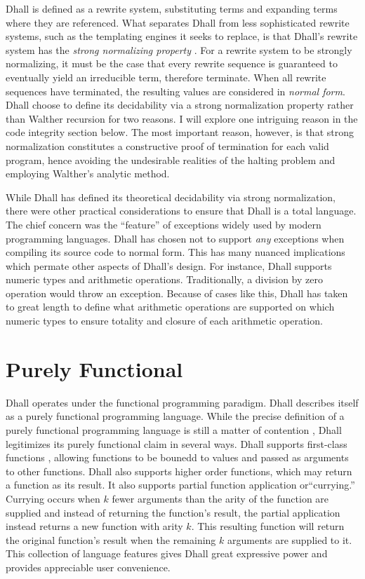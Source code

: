 \documentclass[12pt]{diazessay}
\begin{document}
Dhall is defined as a rewrite system, substituting terms and expanding terms where they are referenced.
What separates Dhall from less sophisticated rewrite systems, such as the templating engines it seeks to replace, is that Dhall's rewrite system has the \emph{strong normalizing property} \cite{bergstra1982strong}.
For a rewrite system to be strongly normalizing, it must be the case that every rewrite sequence is guaranteed to eventually yield an irreducible term, therefore terminate.
When all rewrite sequences have terminated, the resulting values are considered in \emph{normal form}.
Dhall choose to define its decidability via a strong normalization property rather than Walther recursion for two reasons.
I will explore one intriguing reason in the code integrity section below.
The most important reason, however, is that strong normalization constitutes a constructive proof of termination for each valid program, hence avoiding the undesirable realities of the halting problem and employing Walther's analytic method.


While Dhall has defined its theoretical decidability via strong normalization, there were other practical considerations to ensure that Dhall is a total language.
The chief concern was the ``feature'' of exceptions widely used by modern programming languages.
Dhall has chosen not to support \emph{any} exceptions when compiling its source code to normal form.
This has many nuanced implications which permate other aspects of Dhall's design.
For instance, Dhall supports numeric types and arithmetic operations.
Traditionally, a division by zero operation would throw an exception.
Because of cases like this, Dhall has taken to great length to define what arithmetic operations are supported on which numeric types to ensure totality and closure of each arithmetic operation.

\section*{Purely Functional}

Dhall operates under the functional programming paradigm.
Dhall describes itself as a purely functional programming language.
While the precise definition of a purely functional programming language is still a matter of contention \cite{sabry1998purely}, Dhall legitimizes its purely functional claim in several ways.
Dhall supports first-class functions \cite{abelson1996structure}, allowing functions to be bounedd to values and passed as arguments to other functions.
Dhall also supports higher order functions, which may return a function as its result.
It also supports partial function application \cite{curry1958combinatory} or``currying.''
Currying occurs when $k$ fewer arguments than the arity \cite{hazewinkel2011encyclopaedia} of the function are supplied and instead of returning the function's result, the partial application instead returns a new function with arity $k$.
This resulting function will return the original function's result when the remaining $k$ arguments are supplied to it.
This collection of language features gives Dhall great expressive power and provides appreciable user convenience.
\end{document}
